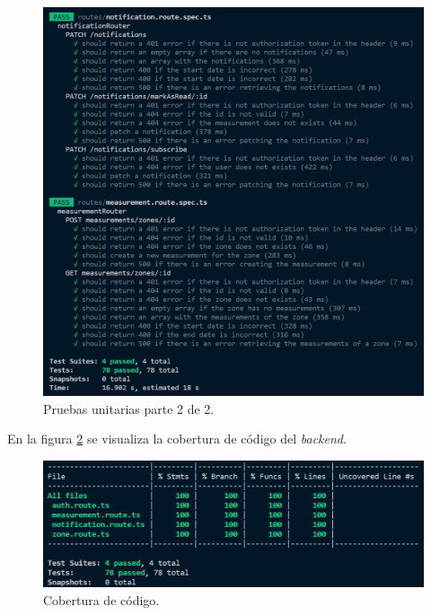 \begin{figure}[H]
	\centering
	\includegraphics[width=.9\textwidth]{./Figures/Backend unit testing 2.png}
	\caption{Pruebas unitarias parte 2 de 2.}
	\label{fig:unitTestingBackend2}
\end{figure}


En la figura \ref{fig:codeCoverageBackend} se visualiza la cobertura de código del \emph{backend}.

\begin{figure}[H]
	\centering
	\includegraphics[width=.9\textwidth]{./Figures/Backend code coverage.png}
	\caption{Cobertura de código.}
	\label{fig:codeCoverageBackend}
\end{figure}


